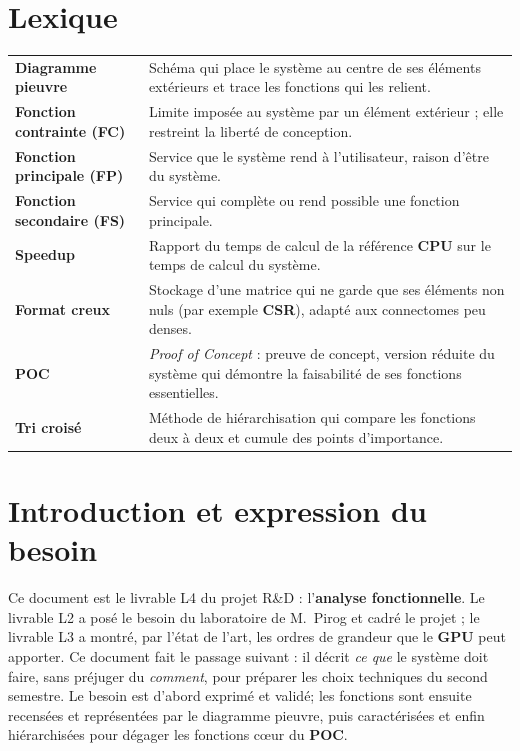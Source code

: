 \documentclass{report}
\title{\DocName}
\author{\DocAuthors}
\date{\textbf{JUNIA - ISEN - AP4} \url{https://github.com/CharlesBta/Modele-Neuronaux-RD.git}}
\begin{document}
\maketitle

\chapter*{Lexique}

\medskip
\begin{tabular}{@{}p{3.9cm}p{11cm}@{}}
    \textbf{Diagramme pieuvre} & Schéma qui place le système au centre de ses éléments extérieurs et trace les fonctions qui les relient. \\[6pt]
    \textbf{Fonction contrainte (FC)} & Limite imposée au système par un élément extérieur ; elle restreint la liberté de conception. \\[6pt]
    \textbf{Fonction principale (FP)} & Service que le système rend à l'utilisateur, raison d'être du système. \\[6pt]
    \textbf{Fonction secondaire (FS)} & Service qui complète ou rend possible une fonction principale. \\[6pt]
    \textbf{Speedup} & Rapport du temps de calcul de la référence \textbf{CPU} sur le temps de calcul du système. \\[6pt]
    \textbf{Format creux} & Stockage d'une matrice qui ne garde que ses éléments non nuls (par exemple \textbf{CSR}), adapté aux connectomes peu denses. \\[6pt]
    \textbf{POC} & \emph{Proof of Concept} : preuve de concept, version réduite du système qui démontre la faisabilité de ses fonctions essentielles. \\[6pt]
    \textbf{Tri croisé} & Méthode de hiérarchisation qui compare les fonctions deux à deux et cumule des points d'importance. \\

\end{tabular}

\tableofcontents

\chapter{Introduction et expression du besoin}

Ce document est le livrable L4 du projet R\&D : l'\textbf{analyse fonctionnelle}. Le livrable L2 a posé le besoin du laboratoire de M.~Pirog et cadré le projet ; le livrable L3 a montré, par l'état de l'art, les ordres de grandeur que le \textbf{GPU} peut apporter. Ce document fait le passage suivant : il décrit \emph{ce que} le système doit faire, sans préjuger du \emph{comment}, pour préparer les choix techniques du second semestre. Le besoin est d'abord exprimé et validé; les fonctions sont ensuite recensées et représentées par le diagramme pieuvre, puis caractérisées et enfin hiérarchisées pour dégager les fonctions cœur du \textbf{POC}.
\end{document}
